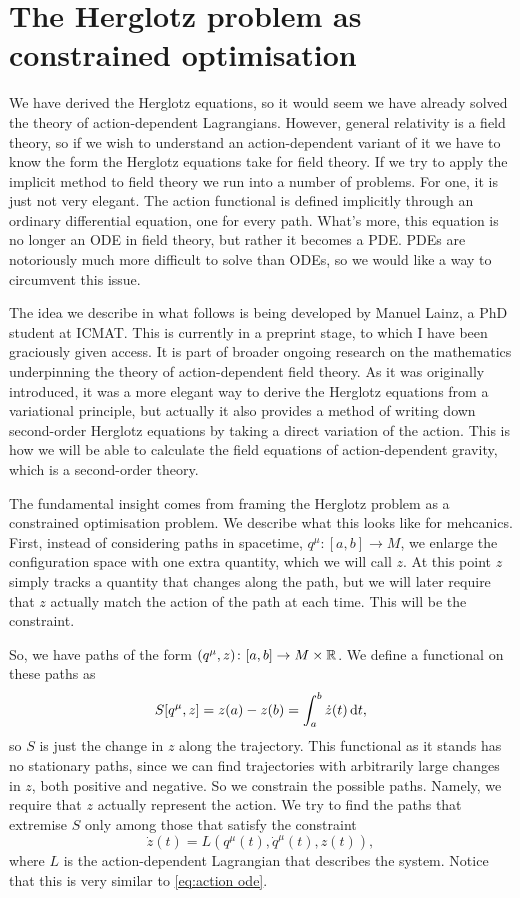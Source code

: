 \documentclass[../main.tex]{subfiles}
\begin{document}
\section{The Herglotz problem as constrained optimisation}
We have derived the Herglotz equations, so it would seem we have already solved the theory
of action-dependent Lagrangians. However, general relativity is a field theory, so if we
wish to understand an action-dependent variant of it we have to know the form the Herglotz
equations take for field theory. If we try to apply the implicit method to field theory we
run into a number of problems. For one, it is just not very elegant. The action functional
is defined implicitly through an ordinary differential equation, one for every path.
What's more, this equation is no longer an ODE in field theory, but rather it becomes a
PDE. PDEs are notoriously much more difficult to solve than ODEs, so we would like a way
to circumvent this issue. 

The idea we describe in what follows is being developed by Manuel Lainz, a PhD student at
ICMAT. This is currently in a preprint stage, to which I have been graciously given
access.  It is part of broader ongoing research on the mathematics underpinning the theory
of action-dependent field theory. As it was originally introduced, it was a more elegant
way to derive the Herglotz equations from a variational principle, but actually it also
provides a method of writing down second-order Herglotz equations by taking a direct
variation of the action. This is how we will be able to calculate the field equations of
action-dependent gravity, which is a second-order theory.

The fundamental insight comes from framing the Herglotz problem as a constrained
optimisation problem.  We describe what this looks like for mehcanics. First, instead of
considering paths in spacetime, \( q^\mu \colon [a,b] \to M \), we enlarge the
configuration space with one extra quantity, which we will call \( z \). At this point \(
z \) simply tracks a quantity that changes along the path, but we will later require that
\( z \) actually match the action of the path at each time. This will be the constraint. 

So, we have paths of the form \( (q^\mu, z) \colon [a,b] \to M \times \mathbb{R} \). We define a
functional on these paths as
\begin{equation}\label{eq:action functional unconstrained}
	S[q^\mu, z] = z(a) - z(b) = \int_a^b \dot{z}(t) \,\mathrm{d} t,
\end{equation}
so \( S \) is just the change in \( z \) along the trajectory. This functional as it
stands has no stationary paths, since we can find trajectories with arbitrarily large
changes in \( z \), both positive and negative. So we constrain the possible paths.
Namely, we require that \( z \) actually represent the action. We try to find the paths
that extremise \( S \) only among those that satisfy the constraint
\begin{equation}\label{eq:constraint mechanics}
	\dot{z}(t) = L(q^\mu(t), \dot{q}^\mu(t), z(t)),
\end{equation}
where \( L \) is the action-dependent Lagrangian that describes the system.  Notice that
this is very similar to \cref{eq:action ode}. 
\end{document}
